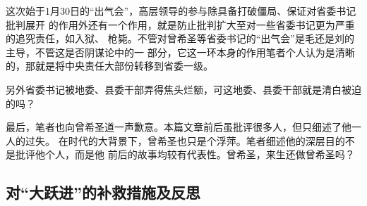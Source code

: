 这次始于1月30日的``出气会''，高层领导的参与除具备打破僵局、保证对省委书记批判展开
的作用外还有一个作用，就是防止批判扩大至对一些省委书记更为严重的追究责任，如入狱、
枪毙。不管对曾希圣等省委书记的``出气会''是毛还是刘的主导，不管这是否阴谋论中的一
部分，它这一环本身的作用笔者个人认为是清晰的，那就是将中央责任大部份转移到省委一级。

另外省委书记被地委、县委干部弄得焦头烂额，可这地委、县委干部就是清白被迫的吗？

最后，笔者也向曾希圣道一声歉意。本篇文章前后虽批评很多人，但只细述了他一人的过失。
在时代的大背景下，曾希圣也只是个浮萍。笔者细述他的深层目的不是批评他个人，而是他
前后的故事均较有代表性。曾希圣，来生还做曾希圣吗？

\subsection{对``大跃进''的补救措施及反思}

